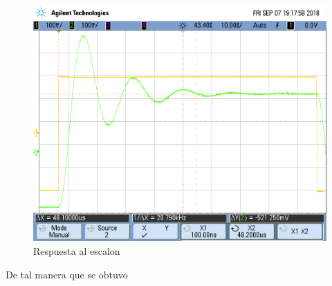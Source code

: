 \begin{figure}[h!]
\centering
\includegraphics[scale=0.25]{LRC2a.png}
\caption{Respuesta al escalon}
\label{fig:LRC2}
\end{figure}

De tal manera que se obtuvo 


